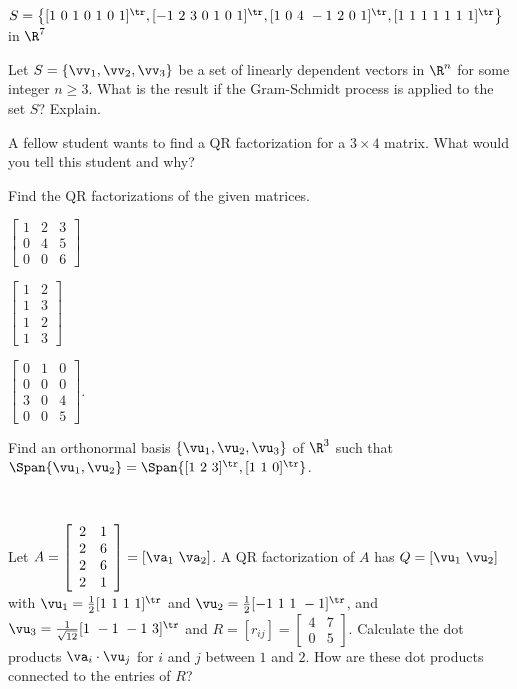 	\item $S = \left\{[1 \ 0 \ 1 \ 0 \ 1 \ 0 \ 1]^{\tr}, [-1 \ 2 \ 3 \ 0 \ 1 \ 0 \ 1]^{\tr},  [1 \ 0 \ 4 \ -1 \ 2 \ 0 \ 1]^{\tr}, [1 \ 1 \ 1 \ 1 \ 1 \ 1 \ 1]^{\tr} \right\}$ in $\R^7$ 

	\ea

\item Let $S = \{\vv_1, \vv_2, \vv_3\}$ be a set of linearly dependent vectors in $\R^n$ for some integer $n \geq 3$. What is the result if the Gram-Schmidt process is applied to the set $S$? Explain.


\item A fellow student wants to find a QR factorization for a $3 \times 4 $ matrix. What would you tell this student and why?

\item Find the QR factorizations of the given matrices.
\ba
\item $\left[ \begin{array}{ccc} 1&2&3 \\ 0&4&5 \\ 0&0&6 \end{array} \right]$

\item $\left[ \begin{array}{cc} 1&2 \\ 1&3 \\ 1&2 \\ 1&3 \end{array} \right]$

\item  $\left[ \begin{array}{ccc} 0&1&0\\0&0&0\\3&0&4 \\ 0&0&5 \end{array} \right]$. 

\ea

\item Find an orthonormal basis $\{\vu_1, \vu_2, \vu_3\}$ of $\R^3$ such that $\Span\{\vu_1,\vu_2\} = \Span\{[1 \ 2 \ 3]^{\tr}, [1 \ 1 \ 0]^{\tr}\}$. 

\item ~
\ba
\item Let $A = \left[ \begin{array}{cc} 2&1\\2&6\\2&6\\2&1 \end{array} \right] = [\va_1 \ \va_2]$. A QR factorization of $A$ has $Q = [\vu_1 \ \vu_2]$ with $\vu_1 = \frac{1}{2}[1 \ 1 \ 1 \ 1]^{\tr}$ and $\vu_2 = \frac{1}{2}[-1 \ 1 \ 1 \ -1]^{\tr}$, and $\vu_3 = \frac{1}{\sqrt{12}}[1 \ -1 \ -1 \ 3]^{\tr}$ and $R = [r_{ij}] = \left[ \begin{array}{cc} 4&7 \\ 0&5 \end{array} \right]$.  Calculate the dot products $\va_i \cdot \vu_j$ for $i$ and $j$ between $1$ and $2$. How are these dot products connected to the entries of $R$? 

